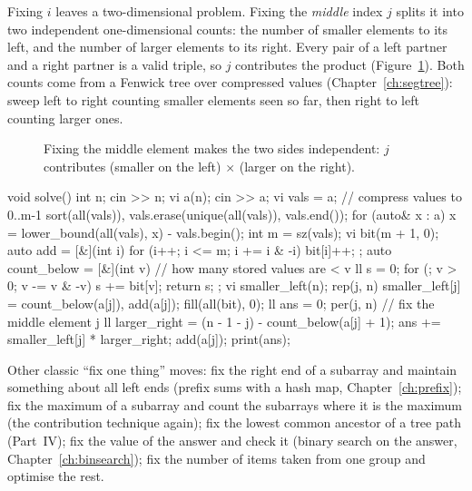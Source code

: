 Fixing $i$ leaves a two-dimensional problem. Fixing the \emph{middle} index $j$ splits it into two independent
one-dimensional counts: the number of smaller elements to its left, and the number of larger elements to its right. Every
pair of a left partner and a right partner is a valid triple, so $j$ contributes the product (Figure~\ref{fig:fixmiddle}).
Both counts come from a Fenwick tree over compressed values (Chapter~\ref{ch:segtree}): sweep left to right counting
smaller elements seen so far, then right to left counting larger ones.

\begin{figure}[htbp]
\centering
{}
\caption{Fixing the middle element makes the two sides independent: $j$ contributes (smaller on the left) $\times$ (larger
on the right).}
\label{fig:fixmiddle}
\end{figure}

\begin{code}
void solve() {
    int n;
    cin >> n;
    vi a(n);
    cin >> a;
    vi vals = a;  // compress values to 0..m-1
    sort(all(vals)), vals.erase(unique(all(vals)), vals.end());
    for (auto& x : a) x = lower_bound(all(vals), x) - vals.begin();
    int m = sz(vals);
    vi bit(m + 1, 0);
    auto add = [&](int i) { for (i++; i <= m; i += i & -i) bit[i]++; };
    auto count_below = [&](int v) {  // how many stored values are < v
        ll s = 0;
        for (; v > 0; v -= v & -v) s += bit[v];
        return s;
    };
    vi smaller_left(n);
    rep(j, n) smaller_left[j] = count_below(a[j]), add(a[j]);
    fill(all(bit), 0);
    ll ans = 0;
    per(j, n) {  // fix the middle element j
        ll larger_right = (n - 1 - j) - count_below(a[j] + 1);
        ans += smaller_left[j] * larger_right;
        add(a[j]);
    }
    print(ans);
}
\end{code}

Other classic ``fix one thing'' moves: fix the right end of a subarray and maintain something about all left ends (prefix
sums with a hash map, Chapter~\ref{ch:prefix}); fix the maximum of a subarray and count the subarrays where it is the
maximum (the contribution technique again); fix the lowest common ancestor of a tree path (Part~IV); fix the value of the
answer and check it (binary search on the answer, Chapter~\ref{ch:binsearch}); fix the number of items taken from one group
and optimise the rest.

